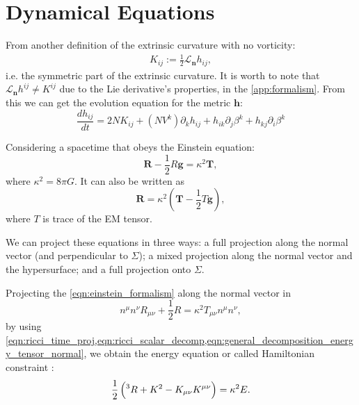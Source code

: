 \section{Dynamical Equations}


From another definition of the extrinsic curvature with no vorticity:
\begin{align}
    K_{ij} := \frac{1}{2} \mathcal{L}_{\mathbf{n}} h_{ij},
\end{align}
i.e. the symmetric part of the extrinsic curvature. It is worth to note that $\mathcal{L}_{\mathbf{n}} h^{ij} \neq K^{ij}$ due to the Lie derivative's properties, in the \cref{app:formalism}. 
From this we can get the evolution equation for the metric $\mathbf{h}$:
\begin{equation}
    \frac{d h_{ij}}{dt} = 2NK_{ij}+(NV^k) \partial_k h_{ij} + h_{ik}\partial_j \beta^k + h_{kj}\partial_i \beta^k
\end{equation}


Considering a spacetime that obeys the Einstein equation:
\begin{equation}
    \mathbf{R}-\frac{1}{2}R\mathbf{g}=\kappa^2 \mathbf{T},
    \label{eqn:einstein_formalism}
\end{equation}
where $\kappa^2=8\pi G$. It can also be written as
\begin{equation}
    \mathbf{R}=\kappa^2 \left(\mathbf{T}-\frac{1}{2}T\mathbf{g}\right),
    \label{eqn:einstein_equiv}
\end{equation}
where $T$ is trace of the EM tensor.

We can project these equations in three ways: a full projection along the normal vector (and perpendicular to $\Sigma$); a mixed projection along the normal vector and the hypersurface; and a full projection onto $\Sigma$.

Projecting the \cref{eqn:einstein_formalism} along the normal vector in
\begin{equation}
    n^\mu n^\nu R_{\mu\nu}+\frac{1}{2}R=\kappa^2 T_{\mu\nu}n^\mu n^\nu,
\end{equation}
by using \cref{eqn:ricci_time_proj,eqn:ricci_scalar_decomp,eqn:general_decomposition_energy_tensor_normal}, we obtain the energy equation or called Hamiltonian constraint \cite{Gourgoulhon:2012ffd}:
\begin{equation}
    \frac{1}{2}\left(\prescript{3}{}R+K^2-K_{\mu\nu}K^{\mu\nu}\right)=\kappa^2 E.
    \label{eqn:energy_equation_normal}
\end{equation}

